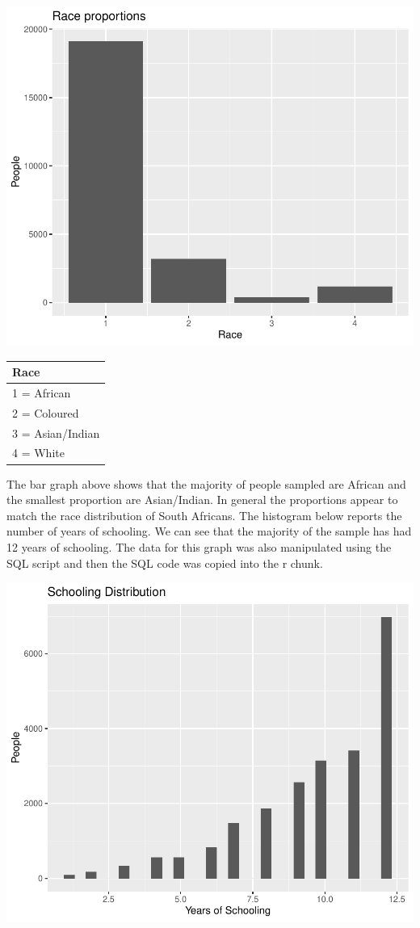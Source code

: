 \documentclass[11pt,preprint, authoryear]{elsarticle}
\numberwithin{equation}{section}
\numberwithin{figure}{section}
\numberwithin{table}{section}
\begin{document}
\includegraphics{20346212MLProject_files/figure-latex/unnamed-chunk-3-1.pdf}

\begin{tabular}{l}
\hline
Race\\
\hline
1 = African\\
\hline
2 = Coloured\\
\hline
3 = Asian/Indian\\
\hline
4 = White\\
\hline
\end{tabular}

The bar graph above shows that the majority of people sampled are
African and the smallest proportion are Asian/Indian. In general the
proportions appear to match the race distribution of South Africans. The
histogram below reports the number of years of schooling. We can see
that the majority of the sample has had 12 years of schooling. The data
for this graph was also manipulated using the SQL script and then the
SQL code was copied into the r chunk.

\includegraphics{20346212MLProject_files/figure-latex/unnamed-chunk-5-1.pdf}
\end{document}
